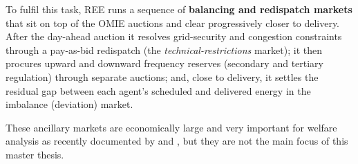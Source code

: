 \documentclass[11pt,a4paper]{article}
\theoremstyle{definition}
\theoremstyle{remark}
\theoremstyle{plain}
\begin{document}
To fulfil this task, REE runs a sequence of \textbf{balancing and redispatch markets} that sit on top of the OMIE auctions and clear progressively closer to delivery. After the day-ahead auction it resolves grid-security and congestion constraints through a pay-as-bid redispatch (the \textit{technical-restrictions} market); it then procures upward and downward frequency reserves (secondary and tertiary regulation) through separate auctions; and, close to delivery, it settles the residual gap between each agent's scheduled and delivered energy in the imbalance (deviation) market. 

These ancillary markets are economically large and very important for welfare analysis as recently documented by \citet{brown_reguant_2026} and \citet{davi_arderius_graf_2026}, but they are not the main focus of this master thesis.
\end{document}
